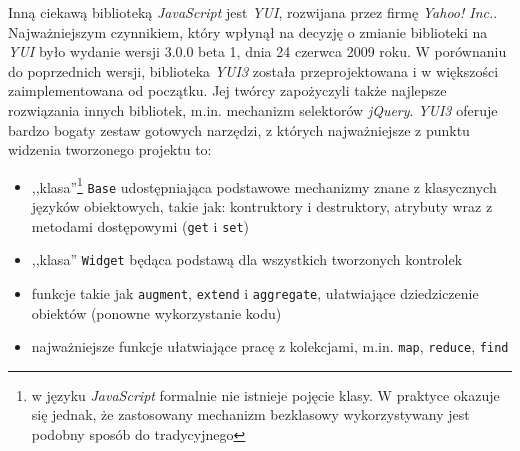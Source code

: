 \documentclass[a4paper,12pt]{article}
\begin{document}
Inną ciekawą biblioteką \emph{JavaScript} jest \emph{YUI}, rozwijana
przez firmę \emph{Yahoo! Inc.}. Najważniejszym czynnikiem, który
wpłynął na decyzję o zmianie biblioteki na \emph{YUI} było wydanie
wersji 3.0.0 beta 1, dnia 24 czerwca 2009 roku. W porównaniu do
poprzednich wersji, biblioteka \emph{YUI3} została przeprojektowana i
w większości zaimplementowana od początku. Jej twórcy zapożyczyli
także najlepsze rozwiązania innych bibliotek, m.in. mechanizm
selektorów \emph{jQuery}. \emph{YUI3} oferuje bardzo bogaty zestaw
gotowych narzędzi, z których najważniejsze z punktu widzenia
tworzonego projektu to:

\begin{itemize}
\item ,,klasa''\footnote{w języku \emph{JavaScript} formalnie nie
    istnieje pojęcie klasy. W praktyce okazuje się jednak, że
    zastosowany mechanizm bezklasowy wykorzystywany jest podobny
    sposób do tradycyjnego} \texttt{Base} udostępniająca podstawowe
  mechanizmy znane z klasycznych języków obiektowych, takie jak:
  kontruktory i destruktory, atrybuty wraz z metodami dostępowymi
  (\texttt{get} i \texttt{set})
\item ,,klasa'' \texttt{Widget} będąca podstawą dla wszystkich
  tworzonych kontrolek
\item funkcje takie jak \texttt{augment}, \texttt{extend} i
  \texttt{aggregate}, ułatwiające dziedziczenie obiektów (ponowne
  wykorzystanie kodu)
\item najważniejsze funkcje ułatwiające pracę z kolekcjami,
  m.in. \texttt{map}, \texttt{reduce}, \texttt{find}
\end{itemize}




\clearpage



\end{document}

